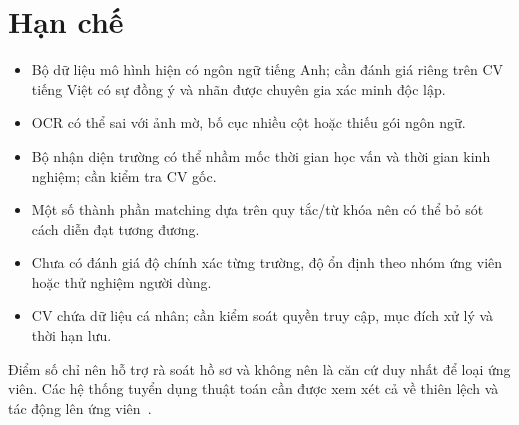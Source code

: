 \section{Hạn chế}
\begin{itemize}[leftmargin=1.6em,itemsep=2pt]
  \item Bộ dữ liệu mô hình hiện có ngôn ngữ tiếng Anh; cần đánh giá riêng trên CV tiếng Việt có sự đồng ý và nhãn được chuyên gia xác minh độc lập.
  \item OCR có thể sai với ảnh mờ, bố cục nhiều cột hoặc thiếu gói ngôn ngữ.
  \item Bộ nhận diện trường có thể nhầm mốc thời gian học vấn và thời gian kinh nghiệm; cần kiểm tra CV gốc.
  \item Một số thành phần matching dựa trên quy tắc/từ khóa nên có thể bỏ sót cách diễn đạt tương đương.
  \item Chưa có đánh giá độ chính xác từng trường, độ ổn định theo nhóm ứng viên hoặc thử nghiệm người dùng.
  \item CV chứa dữ liệu cá nhân; cần kiểm soát quyền truy cập, mục đích xử lý và thời hạn lưu.
\end{itemize}

Điểm số chỉ nên hỗ trợ rà soát hồ sơ và không nên là căn cứ duy nhất để loại ứng viên. Các hệ thống tuyển dụng thuật toán cần được xem xét cả về thiên lệch và tác động lên ứng viên~\cite{Fabris2025}.
